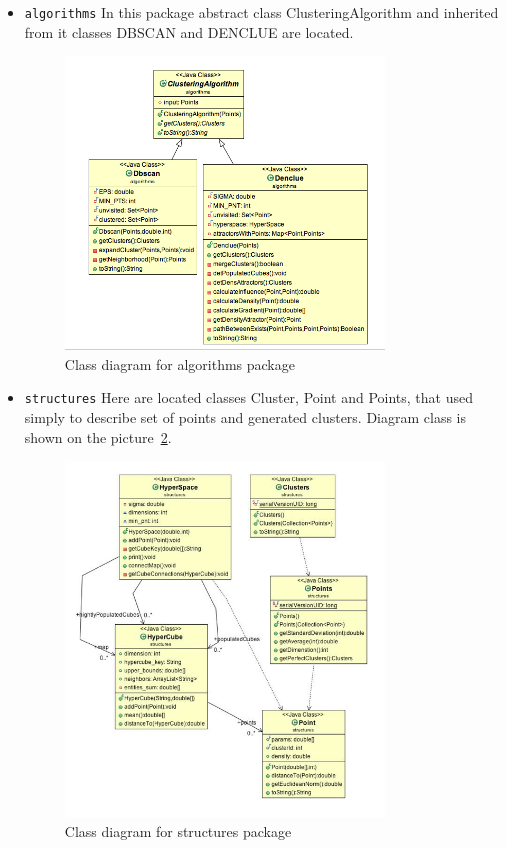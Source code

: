 \documentclass[12pt, a4paper, notitlepage, oneside]{article}
\begin{document}
\begin{itemize}
	\item \texttt{algorithms} In this package abstract class ClusteringAlgorithm and inherited from it classes DBSCAN and DENCLUE are located. 

	\begin{figure}[!ht]
 	\centering
	\includegraphics[width=0.8\textwidth]{images/algorithms_package.png}
 	\caption[]
	{Class diagram for algorithms package}
\label{algorithms}
	\end{figure}


	\item \texttt{structures} Here are located classes Cluster, Point and Points, that used simply to describe set of points and generated clusters. Diagram class is shown on the picture~\ref{structures}.

	\begin{figure}[!ht]
 	\centering
	\includegraphics[width=0.8\textwidth]{images/structures_package.png}
 	\caption[]
	{Class diagram for structures package}
\label{structures}
	\end{figure}



\end{itemize}
\end{document}
